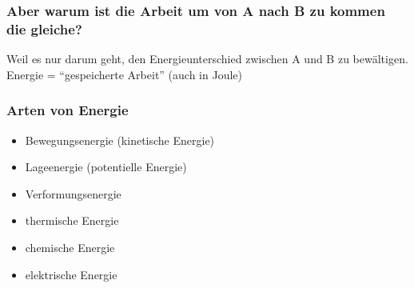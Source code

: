 \documentclass{beamer}
\begin{document}
\begin{frame}
\frametitle{Aber warum ist die Arbeit um von A nach B zu kommen die gleiche?}

Weil es nur darum geht, den Energieunterschied zwischen A und B zu bewältigen. Energie = ``gespeicherte Arbeit'' (auch in Joule)

\pause

\begin{center}
\end{center}


\end{frame}


\begin{frame}
\frametitle{Arten von Energie}

\begin{itemize}
\item
Bewegungsenergie (kinetische Energie)
\item
Lageenergie (potentielle Energie)
\item
Verformungsenergie
\item
thermische Energie
\item
chemische Energie
\item
elektrische Energie
\end{itemize}

\end{frame}
\end{document}
